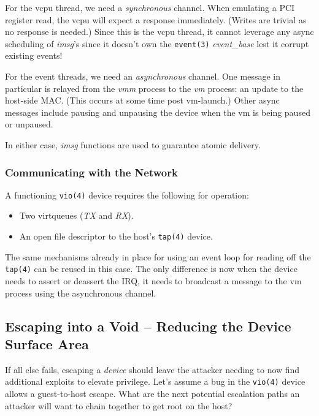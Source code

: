 \documentclass[conference]{IEEEtran}
\begin{document}
For the vcpu thread, we need a \emph{synchronous} channel. When
emulating a PCI register read, the vcpu will expect a response
immediately. (Writes are trivial as no response is needed.) Since this
is the vcpu thread, it cannot leverage any async scheduling of
\emph{imsg}'s since it doesn't own the \texttt{event(3)}
\emph{event\_base} lest it corrupt existing events!

For the event threads, we need an \emph{asynchronous} channel. One
message in particular is relayed from the \emph{vmm} process to the
\emph{vm} process: an update to the host-side MAC. (This occurs at
some time post vm-launch.) Other async messages include pausing and
unpausing the device when the vm is being paused or unpaused.

In either case, \emph{imsg} functions are used to guarantee atomic
delivery.

\vspace{2mm}
\subsubsection{Communicating with the Network}
A functioning \texttt{vio(4)} device requires the following for
operation:

\vspace{2mm}
\begin{itemize}
  \item Two virtqueues (\emph{TX} and \emph{RX}).
  \item An open file descriptor to the host's \texttt{tap(4)} device.
\end{itemize}
\vspace{2mm}

The same mechanisms already in place for using an event loop for
reading off the \texttt{tap(4)} can be reused in this case. The only
difference is now when the device needs to assert or deassert the IRQ,
it needs to broadcast a message to the vm process using the
asynchronous channel.


\vspace{3mm}
\subsection{Escaping into a Void -- Reducing the Device Surface Area}
If all else fails, escaping a \emph{device} should leave the attacker
needing to now find additional exploits to elevate privilege. Let's
assume a bug in the \texttt{vio(4)} device allows a guest-to-host
escape. What are the next potential escalation paths an attacker will
want to chain together to get root on the host?
\end{document}
